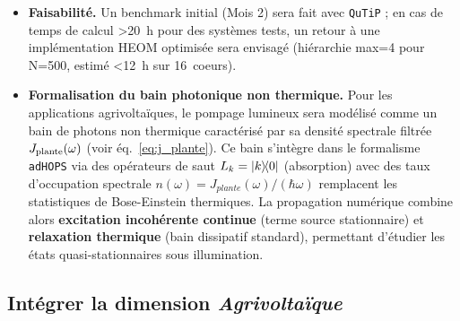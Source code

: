\documentclass[12pt, a4paper]{article}
\begin{document}
\begin{itemize}
    \item \textbf{Faisabilité.} Un benchmark initial (Mois 2) sera fait avec \texttt{QuTiP} ; en cas de temps de calcul \SI{>20}{h} pour des systèmes tests, un retour à une implémentation HEOM optimisée sera envisagé (hiérarchie max=4 pour N=\num{500}, estimé \SI{<12}{h} sur \SI{16}{coeurs}).
    
    \item \textbf{Formalisation du bain photonique non thermique.} Pour les applications agrivoltaïques, le pompage lumineux sera modélisé comme un bain de photons non thermique caractérisé par sa densité spectrale filtrée $J_{\rm plante}(\omega)$ (voir éq.~\eqref{eq:j_plante}). Ce bain s'intègre dans le formalisme \texttt{adHOPS} via des opérateurs de saut $L_k = \op{k}{0}$ (absorption) avec des taux d'occupation spectrale $n(\omega) = J_{plante}(\omega)/(\hbar\omega)$ remplacent les statistiques de Bose-Einstein thermiques. La propagation numérique combine alors \textbf{excitation incohérente continue} (terme source stationnaire) et \textbf{relaxation thermique} (bain dissipatif standard), permettant d'étudier les états quasi-stationnaires sous illumination.
\end{itemize}

\subsection{Intégrer la dimension \textit{Agrivoltaïque}}
\end{document}
